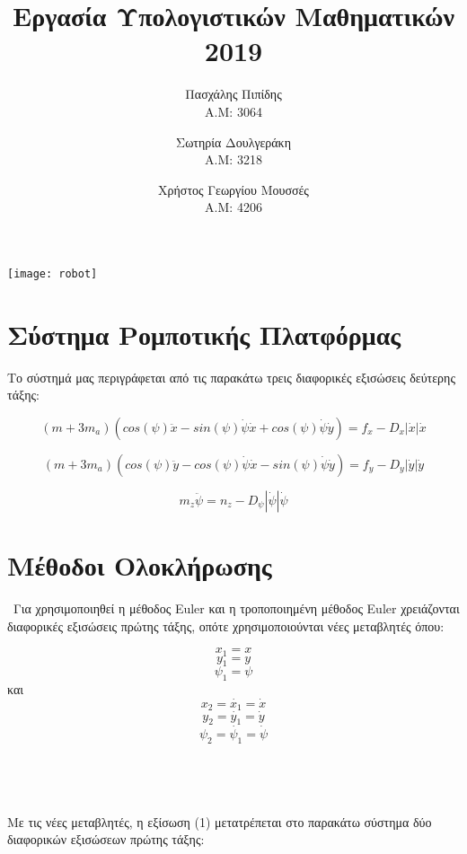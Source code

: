 \documentclass{article}
\begin{document}
 
\title{Εργασία Υπολογιστικών Μαθηματικών 2019}
\author{Πασχάλης Πιπίδης\\A.M: 3064
\and
Σωτηρία Δουλγεράκη\\A.M: 3218
\and
Χρήστος Γεωργίου Μουσσές\\A.M: 4206
}
\date{}

\maketitle
\texttt{[image: robot]}

\newpage
\tableofcontents
\newpage


\section{Σύστημα Ρομποτικής Πλατφόρμας}

Το σύστημά μας περιγράφεται από τις παρακάτω τρεις διαφορικές εξισώσεις δεύτερης τάξης: 

\begin{equation}
(m + 3m_a)(cos(\psi)\ddot{x} - sin(\psi)\dot{\psi}\dot{x} + cos(\psi)\dot{\psi}\dot{y}) = f_x - D_x|\dot{x}|\dot{x}
\end{equation}

\begin{equation}
(m + 3m_a)(cos(\psi)\ddot{y} - cos(\psi)\dot{\psi}\dot{x} - sin(\psi)\dot{\psi}\dot{y}) = f_y - D_y|\dot{y}|\dot{y}
\end{equation}

\begin{equation}
m_z\ddot{\psi} = n_z - D_\psi|\dot{\psi}|\dot{\psi}
\end{equation}

\section{Μέθοδοι Ολοκλήρωσης}\
Για χρησιμοποιηθεί η μέθοδος Euler και η τροποποιημένη μέθοδος Euler χρειάζονται διαφορικές εξισώσεις πρώτης τάξης, οπότε χρησιμοποιούνται νέες μεταβλητές όπου:

\[
x_1 = x
\]
\[
y_1 = y
\]
\[
\psi_1 = \psi
\]
και
\[
x_2 = \dot{x_1} = \dot{x} 
\]
\[
y_2 = \dot{y_1} = \dot{y} 
\]
\[
\psi_2 = \dot{\psi_1} = \dot{\psi} 
\]
\\\\\\\\
Με τις νέες μεταβλητές, η εξίσωση (1) μετατρέπεται στο παρακάτω σύστημα δύο διαφορικών εξισώσεων πρώτης τάξης:
\end{document}
